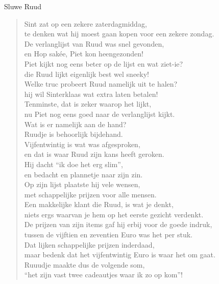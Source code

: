 \documentclass[12pt]{brief}
\date{11 december 2005}
\begin{document}
\begin{letter}{Sluwe Ruud}

\opening{}


\begin{verse}

Sint zat op een zekere zaterdagmiddag,\\
te denken wat hij moest gaan kopen voor een zekere zondag.\\
De verlanglijst van Ruud was snel gevonden,\\
en Hop sak\'ee, Piet kon heengezonden!\\[0.5em]

Piet kijkt nog eens beter op de lijst en wat ziet-ie?\\
die Ruud lijkt eigenlijk best wel sneeky!\\
Welke truc probeert Ruud namelijk uit te halen?\\
hij wil Sinterklaas wat extra laten betalen!\\
Tenminste, dat is zeker waarop het lijkt,\\
nu Piet nog eens goed naar de verlanglijst kijkt.\\[0.5em]

Wat is er namelijk aan de hand?\\
Ruudje is behoorlijk bijdehand.\\
Vijfentwintig is wat was afgesproken,\\
en dat is waar Ruud zijn kans heeft geroken.\\
Hij dacht ``ik doe het erg slim'',\\
en bedacht en plannetje naar zijn zin.\\[0.5em]

Op zijn lijst plaatste hij vele wensen,\\
met schappelijke prijzen voor alle mensen.\\
Een makkelijke klant die Ruud, is wat je denkt,\\
niets ergs waarvan je hem op het eerste gezicht verdenkt.\\[0.5em]

De prijzen van zijn items gaf hij erbij voor de goede indruk,\\
tussen de vijftien en zeventien Euro was het per stuk.\\
Dat lijken schappelijke prijzen inderdaad,\\
maar bedenk dat het vijfentwintig Euro is waar het om gaat.\\
Ruuudje maakte dus de volgende som,\\
``het zijn vast twee cadeautjes waar ik zo op kom''!\\[0.5em]


\end{verse}
\end{letter}
\end{document}
